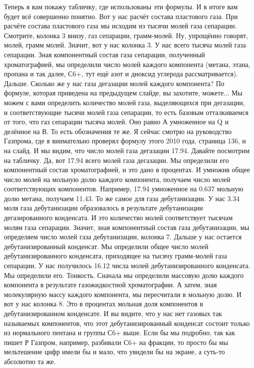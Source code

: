 \documentclass[main.tex]{subfiles}
\begin{document}
Теперь я вам покажу табличку, где использованы эти формулы.
И в итоге вам будет всё совершенно понятно.
Вот у нас расчёт состава пластового газа.
При расчёте состава пластового газа мы исходим из тысячи молей газа сепарации.
Смотрите, колонка 3 внизу, газ сепарации, грамм-молей.
Ну, упрощённо говорят, молей, грамм молей.
Значит, вот у нас колонка 3.
У нас всего тысяча молей газа сепарации.
Зная компонентный состав газа сепарации, полученный хроматографией, мы определили число молей каждого компонента (метана, этана, пропана и так далее, С6+, тут ещё азот и диоксид углерода рассматривается).
Дальше.
Сколько же у нас газа дегазации молей каждого компонента?
По формуле, которая приведена на предыдущем слайде, вы захотите, можете...
Мы можем с вами определить количество молей газа, выделяющихся при дегазации, и соответствующие тысячи молей газа сепарации, то есть базовым отталкиваемся от того, что газ сепарации тысяча молей.
Оно равно А умноженное на Q и делённое на В.
То есть обозначения те же.
Я сейчас смотрю на руководство Газпрома, где я внимательно проверял формулу этого 2010 года, страница 136, и на слайд.
И мы видим, что число молей газа дегазации 17.94.
Давайте посмотрим на табличку.
Да, вот 17.94 всего молей газа дегазации.
Мы определили его компонентный состав хроматографией, и это дано в процентах.
И умножив общее число молей на мольную долю каждого компонента, получаем число молей соответствующих компонентов.
Например, 17.94 умноженное на 0.637 мольную долю метана, получаем 11.43.
То же самое для газа дебутанизации.
У нас 3.34 моля газа дебутанизации образовалось в результате дебутанизации дегазированного конденсата.
И это количество молей соответствует тысячам молям газа сепарации.
Значит, зная компонентный состав газа дебутанизации, мы определяем число молей газа дебутанизации, колонка 7.
Дальше у нас остается дебутанизированный конденсат.
Мы определили общее число молей дебутанизированного конденсата, приходящее на тысячу грамм-молей газа сепарации.
У нас получилось 16.12 числа молей дебутанизированного конденсата.
Мы определили его. Тонкость.
Сначала мы определили массовую долю каждого компонента в результате газожидкостной хроматографии.
А затем, зная молекулярную массу каждого компонента, мы пересчитали в мольную долю.
И вот у нас колонка 8.
Это в процентах мольная доля компонентов в дебутанизированном конденсате.
И вы видите, что у нас нет газовых так называемых компонентов, что этот дебутанизированный конденсат состоит только из нормального пентана и группы С6+ выше.
Если бы мы подробно, так как пишет Р Газпром, например, разбивали С6+ на фракции, то просто бы мы мельтешение цифр имели бы и мало, что увидели бы на экране, а суть-то абсолютно та же.
\end{document}
